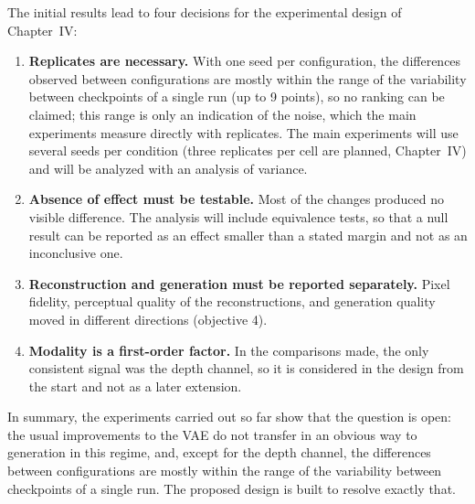 The initial results lead to four decisions for the experimental design of Chapter~IV:

\begin{enumerate}
  \item \textbf{Replicates are necessary.} With one seed per configuration, the differences observed between configurations are mostly within the range of the variability between checkpoints of a single run (up to 9 points), so no ranking can be claimed; this range is only an indication of the noise, which the main experiments measure directly with replicates. The main experiments will use several seeds per condition (three replicates per cell are planned, Chapter~IV) and will be analyzed with an analysis of variance.
  \item \textbf{Absence of effect must be testable.} Most of the changes produced no visible difference. The analysis will include equivalence tests, so that a null result can be reported as an effect smaller than a stated margin and not as an inconclusive one.
  \item \textbf{Reconstruction and generation must be reported separately.} Pixel fidelity, perceptual quality of the reconstructions, and generation quality moved in different directions (objective 4).
  \item \textbf{Modality is a first-order factor.} In the comparisons made, the only consistent signal was the depth channel, so it is considered in the design from the start and not as a later extension.
\end{enumerate}

In summary, the experiments carried out so far show that the question is open: the usual improvements to the VAE do not transfer in an obvious way to generation in this regime, and, except for the depth channel, the differences between configurations are mostly within the range of the variability between checkpoints of a single run. The proposed design is built to resolve exactly that.
